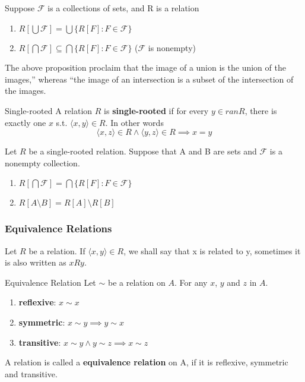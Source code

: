 \begin{proposition}{}{}
  Suppose $\mathcal{F}$ is a collections of sets, and R is a relation
  \begin{enumerate}

    \item $R[\bigcup \mathcal{F}] = \bigcup \{R[F] : F \in \mathcal{F}\}$
    \item $R[\bigcap \mathcal{F}] \subseteq \bigcap \{R[F] : F \in
      \mathcal{F}\}$ ($\mathcal{F}$ is nonempty)

  \end{enumerate}
\end{proposition}
The above proposition proclaim that the image of a union is the union
of the images,” whereas “the image of an intersection is a subset of
the intersection of the images.

\begin{definition}{Single-rooted}{}
  A relation $R$ is \textbf{single-rooted} if for every $y \in ran
  R$, there is exactly one $x$ s.t. $\langle x,y \rangle \in R$. In other words
  \begin{equation*}
    \langle x,z \rangle \in R \land \langle y,z \rangle \in R \implies x = y
  \end{equation*}
\end{definition}

\begin{corollary}{}{}
  Let $R$ be a single-rooted relation. Suppose that A and B are sets
  and $\mathcal{F}$ is a nonempty collection.
  \begin{enumerate}

    \item $R[\bigcap \mathcal{F}] = \bigcap \{R[F] : F \in \mathcal{F}\}$
    \item $R[A \setminus B] = R[A] \setminus R[B]$

  \end{enumerate}
\end{corollary}

\subsubsection{Equivalence Relations}
Let $R$ be a relation. If $\langle x,y \rangle \in R$, we shall say
that x is related to y, sometimes it is also written as $xRy$.

\begin{definition}{Equivalence Relation}{}
  Let $\sim$ be a relation on $A$. For any $x$, $y$ and $z$ in $A$.
  \begin{enumerate}

    \item \textbf{reflexive}: $x \sim x$
    \item \textbf{symmetric}: $x \sim y \implies y \sim x$
    \item \textbf{transitive}: $x \sim y \land y \sim z \implies x \sim z$

  \end{enumerate}
  A relation is called a \textbf{equivalence relation} on A, if it is
  reflexive, symmetric and transitive.
\end{definition}

